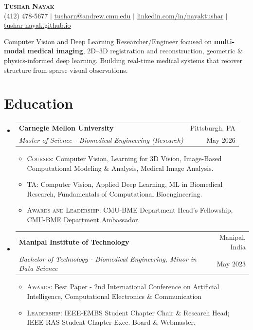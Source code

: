 \documentclass[letterpaper,10pt]{article}
\makeatletter
\newcommand{\resumeItem}[1]{\item\small{#1}}
\newcommand{\resumeSubheading}[4]{
  \vspace{-1pt}\item
    \begin{tabular*}{0.97\textwidth}[t]{l@{\extracolsep{\fill}}r}
      \textbf{#1} & #2 \\
      \textit{#3} & #4 \\
    \end{tabular*}\vspace{-3pt}
}
\newcommand{\resumeSubHeadingListStart}{\begin{itemize}[leftmargin=0.15in, label={}, itemsep=1pt, parsep=0pt]}
\newcommand{\resumeSubHeadingListEnd}{\end{itemize}}
\newcommand{\resumeItemListStartEdu}{\begin{itemize}[leftmargin=0.35in, itemsep=1pt, parsep=0pt]} %
\newcommand{\resumeItemListEnd}{\end{itemize}\vspace{-2pt}}
\makeatother
\begin{document}
\pagestyle{empty}

\begin{center}
    \textsc{\textbf{\LARGE Tushar Nayak}} \\ \vspace{5pt}
    \small (412) 478-5677 $|$ \href{mailto:tusharn@andrew.cmu.edu}{\underline{tusharn@andrew.cmu.edu}} $|$ 
    \href{https://linkedin.com/in/nayaktushar}{\underline{linkedin.com/in/nayaktushar}} $|$
    \href{https://tushar-nayak.github.io/}{\underline{tushar-nayak.github.io}}  
\end{center}

\vspace{-2pt}
\noindent\small
\noindent\small
Computer Vision and Deep Learning Researcher/Engineer focused on \textbf{multi-modal medical imaging}, 2D--3D registration and reconstruction, geometric \& physics-informed deep learning. Building real-time medical systems that recover structure from sparse visual observations.

\vspace{-2pt}

\section{Education}
  \resumeSubHeadingListStart
    \resumeSubheading
      {Carnegie Mellon University}{Pittsburgh, PA}
      {Master of Science - Biomedical Engineering (Research)}{May 2026}
      \vspace{-0.5pt}
      \resumeItemListStartEdu %
        \resumeItem{\textsc{Courses:} Computer Vision, Learning for 3D Vision, Image-Based Computational Modeling \& Analysis, Medical Image Analysis.}
        \resumeItem{\textsc{TA:} Computer Vision, Applied Deep Learning, ML in Biomedical Research, Fundamentals of Computational Bioengineering.}
        \resumeItem{\textsc{Awards and Leadership:} CMU-BME Department Head's Fellowship, CMU-BME Department Ambassador.}
      \resumeItemListEnd
      
    \resumeSubheading
      {Manipal Institute of Technology}{Manipal, India}
      {Bachelor of Technology - Biomedical Engineering, Minor in Data Science}{May 2023}
      \vspace{-0.5pt}
      \resumeItemListStartEdu %
        \resumeItem{\textsc{Awards:} Best Paper - 2nd International Conference on Artificial Intelligence, Computational Electronics \& Communication}
        \resumeItem{\textsc{Leadership:} IEEE-EMBS Student Chapter Chair \& Research Head; IEEE-RAS Student Chapter Exec. Board \& Webmaster.}
      \resumeItemListEnd
  \resumeSubHeadingListEnd
\end{document}
